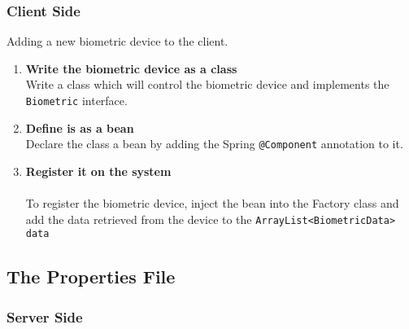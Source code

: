 \subsubsection{Client Side}
Adding a new biometric device to the client.
\begin{enumerate}
	\item \textbf{Write the biometric device as a class}
	\\Write a class which will control the biometric device and implements the \verb|Biometric| interface.
	\item \textbf{Define is as a bean}
	\\Declare the class a bean by adding the Spring  \verb!@Component! annotation to it.
	\item \textbf{Register it on the system} \\
	\\To register the biometric device, inject the bean into the Factory class and add the data retrieved from the device to the \verb|ArrayList<BiometricData> data|
\end{enumerate}

\subsection{The Properties File}
\subsubsection{Server Side}

